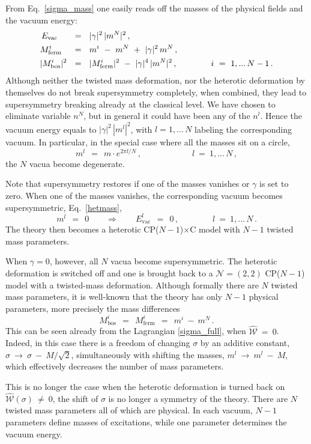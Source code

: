 \documentclass[12pt]{article}
\newcommand{\ntwot}{${\mathcal N}= \left(2,2\right) $ }
\newcommand{\mc}[1]{\mathcal{#1}}
\newcommand{\CPC}{CP($N-1$)$\times$C }
\begin{document}
	From Eq.~\eqref{sigma_mass} one easily reads off the masses of the physical fields
	and the vacuum energy:
\begin{align}
%
\notag
	E_\text{vac}~~\;\, & ~~=~~ |\gamma|^2\, |m^N|^2 \,,
	\\
%
\label{hetmass}
	M_\text{ferm}^i\;\,\, & ~~=~~ m^i ~-~ m^N ~+~ |\gamma|^2\,m^N \,,
	\\
%
\notag
	| M_\text{bos}^i |^2 & ~~=~~ | M_\text{ferm}^i |^2 ~-~ |\gamma|^4\, |m^N|^2\,,
	\qquad\qquad
	i ~=~ 1,...\, N-1\,.
\end{align}
	Although neither the twisted mass deformation, nor the heterotic deformation by themselves
	do not break supersymmetry completely, when combined, they lead to supersymmetry breaking
	already at the classical level.
	We have chosen to eliminate variable $n^N$, but in general it could have been any of the $n^l$.
	Hence the vacuum energy equals to $ |\gamma|^2\, |m^l|^2 $, with $ l = 1,...\, N $ labeling the 
	corresponding vacuum.
	In particular, in the special case where all the masses sit on a circle, 
\[
	m^l ~~=~~ m \cdot e^{2\pi l/N}\,, \qquad\qquad\qquad  l ~=~ 1,...\, N\,,
\]
	the $ N $ vacua become degenerate.

	Note that supersymmetry restores if one of the masses vanishes or $ \gamma $ is set to zero.
	When one of the masses vanishes, the corresponding vacuum becomes supersymmetric,
	Eq.~\eqref{hetmass},
\[
	m^l ~~=~~ 0  \qquad \Rightarrow \qquad E_\text{vac}^l ~~=~~ 0\,, \qquad\qquad l ~=~ 1,...\,N\,.
\]
	The theory then becomes a heterotic \CPC model with $ N - 1 $ twisted mass parameters.

	When $ \gamma = 0 $, however, all $ N $ vacua become supersymmetric.
	The heterotic deformation is switched off and one is brought back to a \ntwot CP($N-1$) model
	with a twisted-mass deformation.
	Although formally there are $ N $ twisted mass parameters, it is well-known that the theory 
	has only $ N - 1 $ physical parameters, more precisely the mass differences
\[
	M_\text{bos}^i ~~=~~ M_\text{ferm}^i ~~=~~ m^i ~-~ m^N\,.
\]
	This can be seen already from the Lagrangian \eqref{sigma_full}, when $ \hat{\mc{W}} ~=~ 0 $. 
	Indeed, in this case there is a freedom of changing $ \sigma $ by an additive constant, 
	$ \sigma ~\to~ \sigma ~-~ M/\sqrt{2} $, simultaneously with shifting the masses, $ m^l ~\to~ m^l ~-~ M $, 
	which effectively decreases the number of mass parameters.

	This is no longer the case when the heterotic deformation is turned back on $ \hat{\mc{W}}(\sigma) ~\neq~ 0 $,
	the shift of $ \sigma $ is no longer a symmetry of the theory.
	There are $ N $ twisted mass parameters all of which are physical. 
	In each vacuum, $ N - 1 $ parameters define masses of excitations, while one parameter determines
	the vacuum energy.
\end{document}
